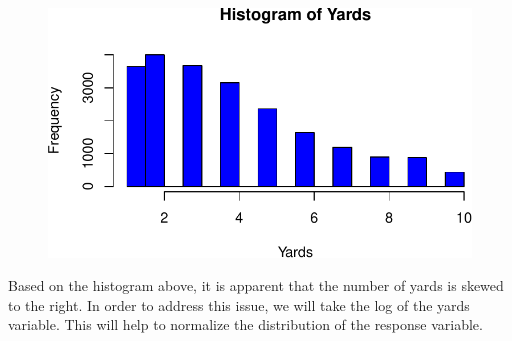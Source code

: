 \documentclass[
  super,
  preprint,
  3p]{elsarticle}
\newenvironment{Shaded}{\begin{snugshade}}{\end{snugshade}}
\newcommand{\AttributeTok}[1]{\textcolor[rgb]{0.40,0.45,0.13}{#1}}
\newcommand{\CommentTok}[1]{\textcolor[rgb]{0.37,0.37,0.37}{#1}}
\newcommand{\FunctionTok}[1]{\textcolor[rgb]{0.28,0.35,0.67}{#1}}
\newcommand{\NormalTok}[1]{\textcolor[rgb]{0.00,0.23,0.31}{#1}}
\newcommand{\SpecialCharTok}[1]{\textcolor[rgb]{0.37,0.37,0.37}{#1}}
\newcommand{\StringTok}[1]{\textcolor[rgb]{0.13,0.47,0.30}{#1}}
\begin{document}
\begin{Shaded}
\end{Shaded}

\begin{figure}[H]

{\centering \includegraphics{project_report_files/figure-pdf/unnamed-chunk-3-1.pdf}

}

\end{figure}

Based on the histogram above, it is apparent that the number of yards is
skewed to the right. In order to address this issue, we will take the
log of the yards variable. This will help to normalize the distribution
of the response variable.

\begin{Shaded}
\end{Shaded}
\end{document}
